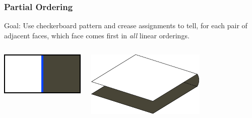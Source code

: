 \documentclass{beamer}
\begin{document}

\begin{frame}
\frametitle{Partial Ordering}
\begin{block}{Goal:}
Use checkerboard pattern and crease assignments to tell, for each pair of adjacent faces, which face comes first in \textit{all} linear orderings.
\end{block}

\bigskip

\begin{columns}[c]
\includegraphics[width=\textwidth]{sam_images/cboard-mountain-tile.pdf}

\pause

\includegraphics[width=.9\textwidth]{sam_images/checkerboard-3d.pdf}

\end{columns}

\end{frame}

\end{document}
